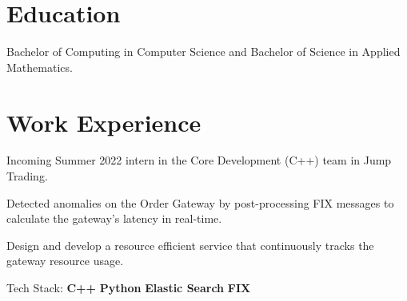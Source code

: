 \documentclass[]{Klement_Resume}
\begin{document}
%
%

%
%


\begin{minipage}[t]{1\textwidth} 


  \section{Education} 

  Bachelor of Computing in Computer Science and Bachelor of Science in Applied Mathematics.
  \sectionsep

    \section{Work Experience}
    \vspace{\topsep} %
    \begin{tightemize}
      \item Incoming Summer 2022 intern in the Core Development (C++) team in Jump Trading.
    \end{tightemize}
    \sectionsep

    \begin{tightemize}
    \item Detected anomalies on the Order Gateway by post-processing FIX messages to calculate the gateway's latency in real-time.
    \item Design and develop a resource efficient service that continuously tracks the gateway resource usage.
    \item Tech Stack: {\bf C++} \textbullet{} {\bf Python} \textbullet{} {\bf Elastic Search} \textbullet{} {\bf FIX}
    \end{tightemize}
    \sectionsep


\end{minipage}
\end{document}
